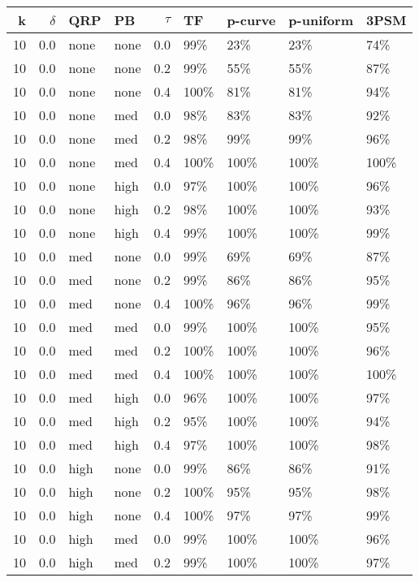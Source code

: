 \begin{longtable}{rrllrllll}
  \hline
{k} & {$\delta$} & {QRP} & {PB} & {$\tau$} & TF & p-curve & p-uniform & 3PSM \\ 
  \hline
10 & 0.0 & none & none & 0.0 & 99\% & 23\% & 23\% & 74\% \\ 
  10 & 0.0 & none & none & 0.2 & 99\% & 55\% & 55\% & 87\% \\ 
  10 & 0.0 & none & none & 0.4 & 100\% & 81\% & 81\% & 94\% \\ 
  10 & 0.0 & none & med & 0.0 & 98\% & 83\% & 83\% & 92\% \\ 
  10 & 0.0 & none & med & 0.2 & 98\% & 99\% & 99\% & 96\% \\ 
  10 & 0.0 & none & med & 0.4 & 100\% & 100\% & 100\% & 100\% \\ 
  10 & 0.0 & none & high & 0.0 & 97\% & 100\% & 100\% & 96\% \\ 
  10 & 0.0 & none & high & 0.2 & 98\% & 100\% & 100\% & 93\% \\ 
  10 & 0.0 & none & high & 0.4 & 99\% & 100\% & 100\% & 99\% \\ 
  10 & 0.0 & med & none & 0.0 & 99\% & 69\% & 69\% & 87\% \\ 
  10 & 0.0 & med & none & 0.2 & 99\% & 86\% & 86\% & 95\% \\ 
  10 & 0.0 & med & none & 0.4 & 100\% & 96\% & 96\% & 99\% \\ 
  10 & 0.0 & med & med & 0.0 & 99\% & 100\% & 100\% & 95\% \\ 
  10 & 0.0 & med & med & 0.2 & 100\% & 100\% & 100\% & 96\% \\ 
  10 & 0.0 & med & med & 0.4 & 100\% & 100\% & 100\% & 100\% \\ 
  10 & 0.0 & med & high & 0.0 & 96\% & 100\% & 100\% & 97\% \\ 
  10 & 0.0 & med & high & 0.2 & 95\% & 100\% & 100\% & 94\% \\ 
  10 & 0.0 & med & high & 0.4 & 97\% & 100\% & 100\% & 98\% \\ 
  10 & 0.0 & high & none & 0.0 & 99\% & 86\% & 86\% & 91\% \\ 
  10 & 0.0 & high & none & 0.2 & 100\% & 95\% & 95\% & 98\% \\ 
  10 & 0.0 & high & none & 0.4 & 100\% & 97\% & 97\% & 99\% \\ 
  10 & 0.0 & high & med & 0.0 & 99\% & 100\% & 100\% & 96\% \\ 
  10 & 0.0 & high & med & 0.2 & 99\% & 100\% & 100\% & 97\% \\ 

\end{longtable}
